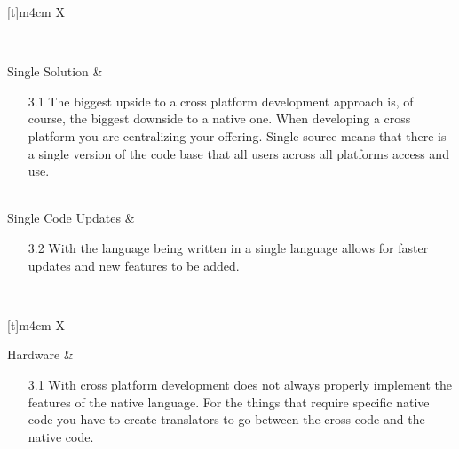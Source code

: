 \begin{center}
\begin{tabularx}{\textwidth}[t]{m{4cm} X}

\hline
{} \\
\hline

Single Solution &
\begin{minipage}[t]{\linewidth}%
\begin{itemize}
\item[3.1] The biggest upside to a cross platform development approach is, of course, the biggest
downside to a native one. When developing a cross platform you are centralizing your offering.
Single-source means that there is a single version of the code base that all users across all platforms
access and use.\\
\end{itemize} 
\end{minipage}\\

\hline
Single Code Updates &
\begin{minipage}[t]{\linewidth}%
\begin{itemize}
\item[3.2] With the language being written in a single language allows for faster updates and new
features to be added.  \\
\end{itemize} 
\end{minipage}\\

\end{tabularx}
\end{center}

\begin{center}
\begin{tabularx}{\textwidth}[t]{m{4cm} X}
\hline
{} \\
\hline

Hardware &
\begin{minipage}[t]{\linewidth}%
\begin{itemize}
\item[3.1] With cross platform development does not always properly implement the features of the
native language. For the things that require specific native code you have to create translators to go
between the cross code and the native code.
\end{itemize} 
\end{minipage}\\

\end{tabularx}
\end{center}



